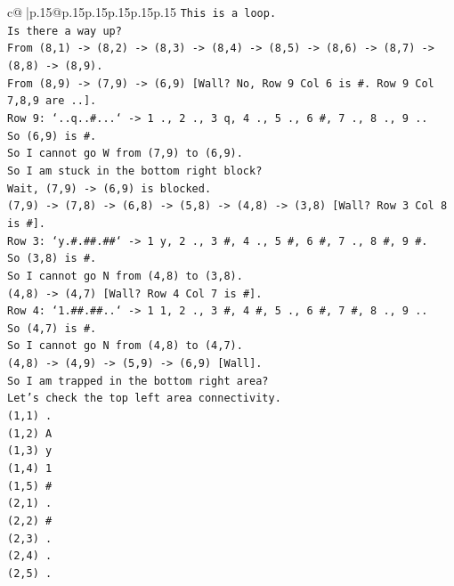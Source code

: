 \documentclass{article}
\begin{document}
{\begin{supertabular}{c@{$\;$}|p{.15\linewidth}@{}p{.15\linewidth}p{.15\linewidth}p{.15\linewidth}p{.15\linewidth}p{.15\linewidth}}
{{{\texttt{This is a loop.} \\
\texttt{Is there a way up?} \\
\texttt{From (8,1) {-}> (8,2) {-}> (8,3) {-}> (8,4) {-}> (8,5) {-}> (8,6) {-}> (8,7) {-}> (8,8) {-}> (8,9).} \\
\texttt{From (8,9) {-}> (7,9) {-}> (6,9) {[}Wall? No, Row 9 Col 6 is \#. Row 9 Col 7,8,9 are ..{]}.} \\
\texttt{Row 9: `..q..\#...` {-}> 1 ., 2 ., 3 q, 4 ., 5 ., 6 \#, 7 ., 8 ., 9 ..} \\
\texttt{So (6,9) is \#.} \\
\texttt{So I cannot go W from (7,9) to (6,9).} \\
\texttt{So I am stuck in the bottom right block?} \\
\texttt{Wait, (7,9) {-}> (6,9) is blocked.} \\
\texttt{(7,9) {-}> (7,8) {-}> (6,8) {-}> (5,8) {-}> (4,8) {-}> (3,8) {[}Wall? Row 3 Col 8 is \#{]}.} \\
\texttt{Row 3: `y.\#.\#\#.\#\#` {-}> 1 y, 2 ., 3 \#, 4 ., 5 \#, 6 \#, 7 ., 8 \#, 9 \#.} \\
\texttt{So (3,8) is \#.} \\
\texttt{So I cannot go N from (4,8) to (3,8).} \\
\texttt{(4,8) {-}> (4,7) {[}Wall? Row 4 Col 7 is \#{]}.} \\
\texttt{Row 4: `1.\#\#.\#\#..` {-}> 1 1, 2 ., 3 \#, 4 \#, 5 ., 6 \#, 7 \#, 8 ., 9 ..} \\
\texttt{So (4,7) is \#.} \\
\texttt{So I cannot go N from (4,8) to (4,7).} \\
\texttt{(4,8) {-}> (4,9) {-}> (5,9) {-}> (6,9) {[}Wall{]}.} \\
\texttt{So I am trapped in the bottom right area?} \\
\texttt{Let's check the top left area connectivity.} \\
\texttt{(1,1) .} \\
\texttt{(1,2) A} \\
\texttt{(1,3) y} \\
\texttt{(1,4) 1} \\
\texttt{(1,5) \#} \\
\texttt{(2,1) .} \\
\texttt{(2,2) \#} \\
\texttt{(2,3) .} \\
\texttt{(2,4) .} \\
\texttt{(2,5) .} \\
}}}
\end{supertabular}}
\end{document}
